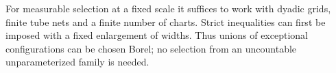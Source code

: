 For measurable selection at a fixed scale it suffices to work with
dyadic grids, finite tube nets and a finite number of charts.
Strict inequalities can first be imposed with a fixed enlargement of
widths. Thus unions of exceptional configurations can be chosen Borel;
no selection from an uncountable unparameterized family is needed.
